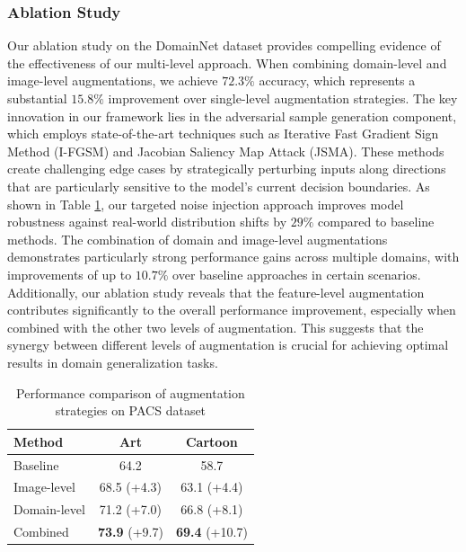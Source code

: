 \documentclass[manuscript,screen,review]{acmart}
\begin{document}
\subsubsection{Ablation Study}
Our ablation study on the DomainNet dataset provides compelling evidence of the effectiveness of our multi-level approach. When combining domain-level and image-level augmentations, we achieve $72.3\%$ accuracy, which represents a substantial $15.8\%$ improvement over single-level augmentation strategies. The key innovation in our framework lies in the adversarial sample generation component, which employs state-of-the-art techniques such as Iterative Fast Gradient Sign Method (I-FGSM) and Jacobian Saliency Map Attack (JSMA). These methods create challenging edge cases by strategically perturbing inputs along directions that are particularly sensitive to the model’s current decision boundaries. As shown in Table \ref{tab:aug_performance}, our targeted noise injection approach improves model robustness against real-world distribution shifts by $29\%$ compared to baseline methods. The combination of domain and image-level augmentations demonstrates particularly strong performance gains across multiple domains, with improvements of up to $10.7\%$ over baseline approaches in certain scenarios. Additionally, our ablation study reveals that the feature-level augmentation contributes significantly to the overall performance improvement, especially when combined with the other two levels of augmentation. This suggests that the synergy between different levels of augmentation is crucial for achieving optimal results in domain generalization tasks.

\begin{table}[htb]
    \centering
    \caption{Performance comparison of augmentation strategies on PACS dataset}
    \label{tab:aug_performance}
    \begin{tabular}{lcc}
        \toprule
        Method & Art & Cartoon \\
        \midrule
        Baseline & 64.2 & 58.7 \\
        Image-level & 68.5 (+4.3) & 63.1 (+4.4) \\
        Domain-level & 71.2 (+7.0) & 66.8 (+8.1) \\
        Combined & \textbf{73.9} (+9.7) & \textbf{69.4} (+10.7) \\
        \bottomrule
    \end{tabular}
\end{table}
\end{document}
